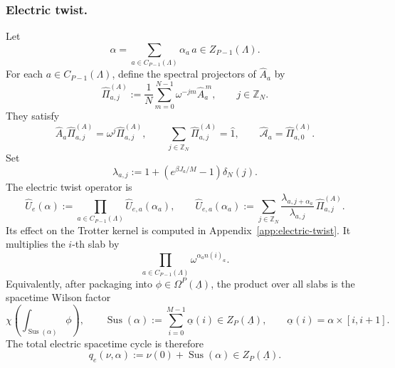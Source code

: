 \documentclass[dvipsnames,a4paper]{article}
\numberwithin{equation}{section}
\theoremstyle{definition}
\theoremstyle{remark}
\newcommand{\Sus}{\operatorname{Sus}}
\begin{document}
\subsubsection{Electric twist.}
Let
\begin{equation}
\alpha=\sum_{a\in C_{P-1}(\Lambda)}\alpha_a\,a
\in Z_{P-1}(\Lambda).
\end{equation}
For each \(a\in C_{P-1}(\Lambda)\), define the spectral projectors of \(\hat A_a\) by
\begin{equation}
	\hat\Pi_{a,j}^{(A)}
	:=
	\frac1N\sum_{m=0}^{N-1}\omega^{-jm}\hat A_a^{\,m},
	\qquad
	j\in\mathbb Z_N.
\end{equation}
They satisfy
\begin{equation}
\hat A_a\hat\Pi_{a,j}^{(A)}
=
\omega^j\hat\Pi_{a,j}^{(A)},
\qquad
\sum_{j\in\mathbb Z_N}\hat\Pi_{a,j}^{(A)}=\hat 1,
\qquad
\hat{\mathcal A}_a=\hat\Pi_{a,0}^{(A)}.
\label{eq:Aproj-relations}
\end{equation}
Set
\begin{equation}
	\lambda_{a,j}
	:=
	1+\left(e^{\beta J_a/M}-1\right)\delta_N(j).
\end{equation}
The electric twist operator is
\begin{equation}
	\hat U_e(\alpha)
	:=
	\prod_{a\in C_{P-1}(\Lambda)}\hat U_{e,a}(\alpha_a),
	\qquad
	\hat U_{e,a}(\alpha_a)
	:=
	\sum_{j\in\mathbb Z_N}
	\frac{\lambda_{a,j+\alpha_a}}{\lambda_{a,j}}\,
	\hat\Pi_{a,j}^{(A)} .
	\label{eq:electric-twist-operator}
\end{equation}
Its effect on the Trotter kernel is computed in Appendix~\ref{app:electric-twist}. It
multiplies the \(i\)-th slab by
\begin{equation}
\prod_{a\in C_{P-1}(\Lambda)}\omega^{\alpha_a n(i)_a}.
\end{equation}
Equivalently, after packaging into \(\phi\in\Omega^P(\underline\Lambda)\), the product over
all slabs is the spacetime Wilson factor
\begin{equation}
	\chi\left(\int_{\Sus(\alpha)}\phi\right),
	\qquad
	\Sus(\alpha)
	:=
	\sum_{i=0}^{M-1}\underline\alpha(i)\in Z_P(\underline\Lambda),
	\qquad
	\underline\alpha(i)=\alpha\times[i,i+1].
	\label{eq:electric-suspension}
\end{equation}
The total electric spacetime cycle is therefore
\begin{equation}
	q_e(\nu,\alpha)
	:=
	\nu(0)+\Sus(\alpha)
	\in Z_P(\underline\Lambda).
	\label{eq:qe}
\end{equation}
\end{document}
